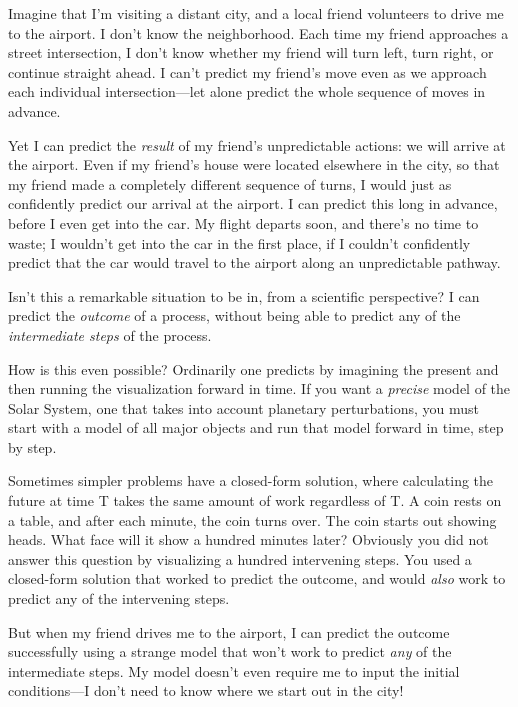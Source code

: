 {
 Imagine that I'm visiting a distant city, and a
local friend volunteers to drive me to the airport. I
don't know the neighborhood. Each time my friend
approaches a street intersection, I don't know whether
my friend will turn left, turn right, or continue straight ahead. I
can't predict my friend's move even as
we approach each individual intersection---let alone predict the whole
sequence of moves in advance.}

{
 Yet I can predict the \textit{result} of my
friend's unpredictable actions: we will arrive at the
airport. Even if my friend's house were located
elsewhere in the city, so that my friend made a completely different
sequence of turns, I would just as confidently predict our arrival at
the airport. I can predict this long in advance, before I even get into
the car. My flight departs soon, and there's no time to
waste; I wouldn't get into the car in the first place,
if I couldn't confidently predict that the car would
travel to the airport along an unpredictable pathway.}

{
 Isn't this a remarkable situation to be in, from a
scientific perspective? I can predict the \textit{outcome} of a
process, without being able to predict any of the \textit{intermediate
steps} of the process.}

{
 How is this even possible? Ordinarily one predicts by imagining
the present and then running the visualization forward in time. If you
want a \textit{precise} model of the Solar System, one that takes into
account planetary perturbations, you must start with a model of all
major objects and run that model forward in time, step by step.}

{
 Sometimes simpler problems have a closed-form solution, where
calculating the future at time T takes the same amount of work
regardless of T. A coin rests on a table, and after each minute, the
coin turns over. The coin starts out showing heads. What face will it
show a hundred minutes later? Obviously you did not answer this
question by visualizing a hundred intervening steps. You used a
closed-form solution that worked to predict the outcome, and would
\textit{also} work to predict any of the intervening steps.}

{
 But when my friend drives me to the airport, I can predict the
outcome successfully using a strange model that won't
work to predict \textit{any} of the intermediate steps. My model
doesn't even require me to input the initial
conditions---I don't need to know where we start out in
the city!}

